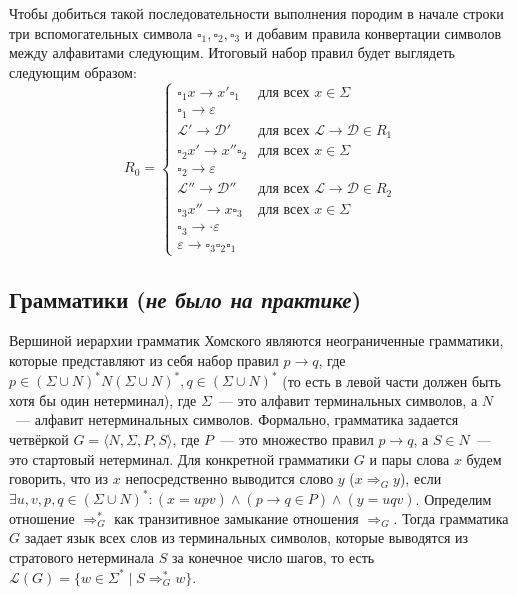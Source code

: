 \documentclass[
    11pt,
    a4paper
]{article}
\theoremstyle{definition}
\begin{document}
Чтобы добиться такой последовательности выполнения породим в начале строки три вспомогательных символа $\square_1, \square_2, \square_3$ и добавим правила конвертации символов между алфавитами следующим. Итоговый набор правил будет выглядеть следующим образом:
$$R_0 = \begin{cases}
\square_1 x \rightarrow x' \square_1 & \text{для всех } x \in \Sigma\\
\square_1 \rightarrow \varepsilon\\
\mathcal{L'} \rightarrow \mathcal{D'} & \text{для всех } \mathcal{L} \rightarrow \mathcal{D} \in R_1\\
\square_2 x' \rightarrow x'' \square_2 & \text{для всех } x \in \Sigma\\
\square_2 \rightarrow \varepsilon\\
\mathcal{L''} \rightarrow \mathcal{D''} & \text{для всех } \mathcal{L} \rightarrow \mathcal{D} \in R_2\\
\square_3 x'' \rightarrow x \square_3 & \text{для всех } x \in \Sigma\\
\square_3 \rightarrow \cdot \varepsilon\\
\varepsilon \rightarrow \square_3 \square_2 \square_1
\end{cases}$$

\subsection{Грамматики (\textit{не было на практике})}

Вершиной иерархии грамматик Хомского являются неограниченные грамматики, которые представляют из себя набор правил $p \rightarrow q$, где $p \in (\Sigma \cup N)^*N(\Sigma \cup N)^*, q \in (\Sigma \cup N)^*$ (то есть в левой части должен быть хотя бы один нетерминал), где $\Sigma$~--- это алфавит терминальных символов, а $N$~--- алфавит нетерминальных символов. Формально, грамматика задается четвёркой $G = \langle N, \Sigma, P, S \rangle$, где $P$~--- это множество правил $p \rightarrow q$, а $S \in N$~--- это стартовый нетерминал. Для конкретной грамматики $G$ и пары слова $x$ будем говорить, что из $x$ непосредственно выводится слово $y$ ($x \Rightarrow_G y$), если $\exists u, v, p, q \in (\Sigma \cup N)^*: (x = upv) \wedge (p \rightarrow q \in P) \wedge (y = uqv)$. Определим отношение $\Rightarrow_G^*$ как транзитивное замыкание отношения $\Rightarrow_G$. Тогда грамматика $G$ задает язык всех слов из терминальных символов, которые выводятся из стратового нетерминала $S$ за конечное число шагов, то есть $\mathcal{L}(G) = \{ w \in \Sigma^* \mid S \Rightarrow_G^* w \}$.
\end{document}
